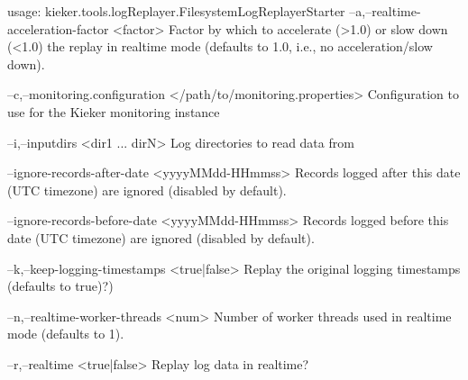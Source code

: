 usage: kieker.tools.logReplayer.FilesystemLogReplayerStarter
 --a,--realtime-acceleration-factor <factor>
        Factor by which to accelerate (>1.0) or slow down (<1.0) the
        replay in realtime mode (defaults to 1.0, i.e., no
        acceleration/slow down).

 --c,--monitoring.configuration </path/to/monitoring.properties>
        Configuration to use for the Kieker monitoring instance

 --i,--inputdirs <dir1 ... dirN>
        Log directories to read data from

    --ignore-records-after-date <yyyyMMdd-HHmmss>
        Records logged after this date (UTC timezone) are ignored
        (disabled by default).

    --ignore-records-before-date <yyyyMMdd-HHmmss>
        Records logged before this date (UTC timezone) are ignored
        (disabled by default).

 --k,--keep-logging-timestamps <true|false>
        Replay the original logging timestamps (defaults to true)?)

 --n,--realtime-worker-threads <num>
        Number of worker threads used in realtime mode (defaults to 1).

 --r,--realtime <true|false>
        Replay log data in realtime?
